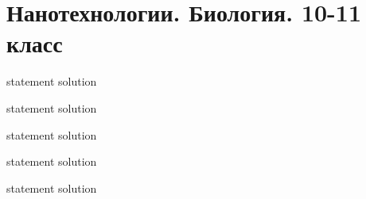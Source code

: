 \chapter{Нанотехнологии. Биология. 10-11 класс}

{statement}
{solution}

{statement}
{solution}

{statement}
{solution}

{statement}
{solution}

{statement}
{solution}